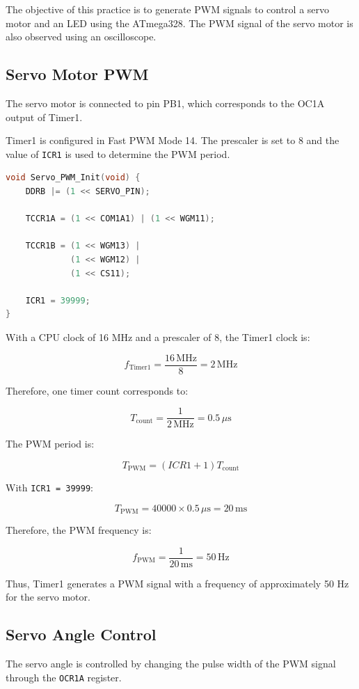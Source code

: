 \documentclass[12pt,a4paper]{article}
\begin{document}
The objective of this practice is to generate PWM signals to control a
servo motor and an LED using the ATmega328. The PWM signal of the servo
motor is also observed using an oscilloscope.

\subsection{Servo Motor PWM}

The servo motor is connected to pin PB1, which corresponds to the OC1A
output of Timer1.

Timer1 is configured in Fast PWM Mode 14. The prescaler is set to 8 and
the value of \texttt{ICR1} is used to determine the PWM period.

\begin{lstlisting}[language=C]
void Servo_PWM_Init(void) {
    DDRB |= (1 << SERVO_PIN);

    TCCR1A = (1 << COM1A1) | (1 << WGM11);

    TCCR1B = (1 << WGM13) |
             (1 << WGM12) |
             (1 << CS11);

    ICR1 = 39999;
}
\end{lstlisting}

With a CPU clock of 16 MHz and a prescaler of 8, the Timer1 clock is:

\[
f_{\mathrm{Timer1}}
=
\frac{16\,\mathrm{MHz}}{8}
=
2\,\mathrm{MHz}
\]

Therefore, one timer count corresponds to:

\[
T_{\mathrm{count}}
=
\frac{1}{2\,\mathrm{MHz}}
=
0.5\,\mu\mathrm{s}
\]

The PWM period is:

\[
T_{\mathrm{PWM}}
=
(ICR1+1)T_{\mathrm{count}}
\]

With \texttt{ICR1 = 39999}:

\[
T_{\mathrm{PWM}}
=
40000 \times 0.5\,\mu\mathrm{s}
=
20\,\mathrm{ms}
\]

Therefore, the PWM frequency is:

\[
f_{\mathrm{PWM}}
=
\frac{1}{20\,\mathrm{ms}}
=
50\,\mathrm{Hz}
\]

Thus, Timer1 generates a PWM signal with a frequency of approximately
50 Hz for the servo motor.

\subsection{Servo Angle Control}

The servo angle is controlled by changing the pulse width of the PWM
signal through the \texttt{OCR1A} register.
\end{document}
